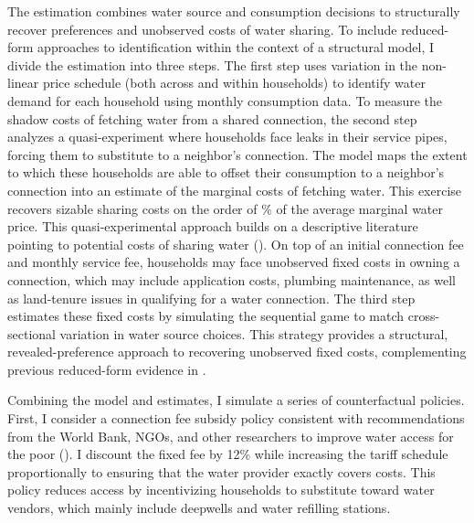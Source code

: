 \documentclass[12pt]{article}
\begin{document}
The estimation combines water source and consumption decisions to structurally recover preferences and unobserved costs of water sharing.  To include reduced-form approaches to identification within the context of a structural model, I divide the estimation into three steps.  The first step uses variation in the non-linear price schedule (both across and within households) to identify water demand for each household using monthly consumption data.  To measure the shadow costs of fetching water from a shared connection, the second step analyzes a quasi-experiment where households face leaks in their service pipes, forcing them to substitute to a neighbor's connection.  The model maps the extent to which these households are able to offset their consumption to a neighbor's connection into an estimate of the marginal costs of fetching water.  This exercise recovers sizable sharing costs on the order of \unskip\% of the average marginal water price.  This quasi-experimental approach builds on a descriptive literature pointing to potential costs of sharing water (\cite{whittington1992possible,nauges2006water}).  On top of an initial connection fee and monthly service fee, households may face unobserved fixed costs in owning a connection, which may include application costs, plumbing maintenance, as well as land-tenure issues in qualifying for a water connection.  The third step estimates these fixed costs by simulating the sequential game to match cross-sectional variation in water source choices.  This strategy provides a structural, revealed-preference approach to recovering unobserved fixed costs, complementing previous reduced-form evidence in \cite{devoto2012happiness}.

Combining the model and estimates, I simulate a series of counterfactual policies.  First, I consider a connection fee subsidy policy consistent with recommendations from the World Bank, NGOs, and other researchers to improve water access for the poor (\cite{komives2005water,wsup,jimenez2014factors,mcintosh2003asian}).  I discount the fixed fee by 12\% while increasing the tariff schedule proportionally to ensuring that the water provider exactly covers costs.  This policy reduces access by incentivizing households to substitute toward water vendors, which mainly include deepwells and water refilling stations.  

\end{document}
